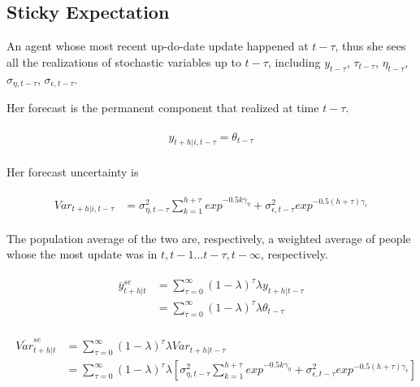 \documentclass[]{article}
\begin{document}
\subsection{Sticky Expectation}

An agent whose most recent up-do-date update happened at $t-\tau$, thus she sees all the realizations of stochastic variables up to $t-\tau$, including $y_{t-\tau}$, $\tau_{t-\tau}$, $\eta_{t-\tau}$, $\sigma_{\eta,t-\tau}$, $\sigma_{\epsilon,t-\tau}$. 

Her forecast is the permanent component that realized at time $t-\tau$. 

\begin{eqnarray}
\begin{split}
y_{t+h|i,t-\tau}  = \theta_{t-\tau} 
\end{split}
\end{eqnarray}

Her forecast uncertainty is 


\begin{eqnarray}
\begin{split}
Var_{t+h|i,t-\tau} & = \sigma^2_{\eta,t-\tau} \sum^{h+\tau}_{k=1} exp^{- 0.5k\gamma_{\eta}} +  \sigma^2_{\epsilon,t-\tau} exp^{- 0.5(h+\tau)\gamma_{\epsilon}}
\end{split} 
\end{eqnarray}

The population average of the two are, respectively, a weighted average of people whose the most update was in $t, t-1... t-\tau, t-\infty$, respectively. 


\begin{eqnarray}
\begin{split}
\overline y^{se}_{t+h|t} & = \sum^{\infty}_{\tau=0} (1-\lambda)^\tau\lambda y_{t+h|t-\tau} \\
& = \sum^{\infty}_{\tau=0} (1-\lambda)^\tau\lambda \theta_{t-\tau}
\end{split} 
\end{eqnarray}



\begin{eqnarray}
\begin{split}
\overline {Var}^{se}_{t+h|t} & = \sum^{\infty}_{\tau=0} (1-\lambda)^\tau\lambda Var_{t+h|t-\tau} \\
& = \sum^{\infty}_{\tau=0} (1-\lambda)^\tau\lambda [ \sigma^2_{\eta,t-\tau} \sum^{h+\tau}_{k=1} exp^{- 0.5k\gamma_{\eta}} +  \sigma^2_{\epsilon,t-\tau} exp^{- 0.5(h+\tau)\gamma_{\epsilon}}]
\end{split} 
\end{eqnarray}
\end{document}
